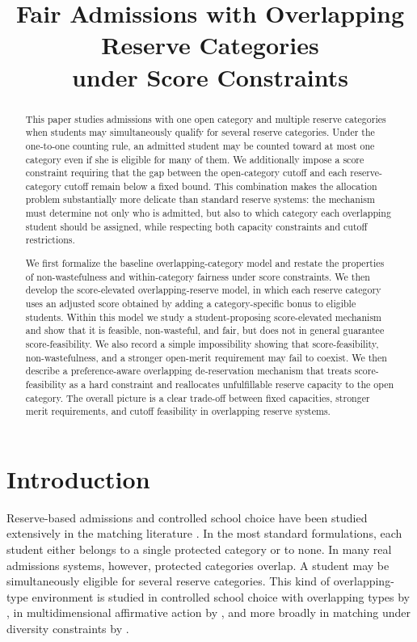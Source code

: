 \documentclass[12pt]{article}
\title{Fair Admissions with Overlapping Reserve Categories\\
under Score Constraints}
\author{}
\date{}
\newcommand{\1}{\mathbf{1}}
\begin{document}
\maketitle
\vspace{-2em}

\begin{abstract}
This paper studies admissions with one open category and multiple reserve categories when students may simultaneously qualify for several reserve categories. Under the one-to-one counting rule, an admitted student may be counted toward at most one category even if she is eligible for many of them. We additionally impose a score constraint requiring that the gap between the open-category cutoff and each reserve-category cutoff remain below a fixed bound. This combination makes the allocation problem substantially more delicate than standard reserve systems: the mechanism must determine not only who is admitted, but also to which category each overlapping student should be assigned, while respecting both capacity constraints and cutoff restrictions.

We first formalize the baseline overlapping-category model and restate the properties of non-wastefulness and within-category fairness under score constraints. We then develop the score-elevated overlapping-reserve model, in which each reserve category uses an adjusted score obtained by adding a category-specific bonus to eligible students. Within this model we study a student-proposing score-elevated mechanism and show that it is feasible, non-wasteful, and fair, but does not in general guarantee score-feasibility. We also record a simple impossibility showing that score-feasibility, non-wastefulness, and a stronger open-merit requirement may fail to coexist. We then describe a preference-aware overlapping de-reservation mechanism that treats score-feasibility as a hard constraint and reallocates unfulfillable reserve capacity to the open category. The overall picture is a clear trade-off between fixed capacities, stronger merit requirements, and cutoff feasibility in overlapping reserve systems.
\end{abstract}

\section{Introduction}
Reserve-based admissions and controlled school choice have been studied extensively in the matching literature \citep{Abdu05a,EHYY14a,AyTu20a,AyTu23a}. In the most standard formulations, each student either belongs to a single protected category or to none. In many real admissions systems, however, protected categories overlap. A student may be simultaneously eligible for several reserve categories. This kind of overlapping-type environment is studied in controlled school choice with overlapping types by \citet{KHIY17a}, in multidimensional affirmative action by \citet{AyBo21a}, and more broadly in matching under diversity constraints by \citet{GKK+17a}.
\end{document}
